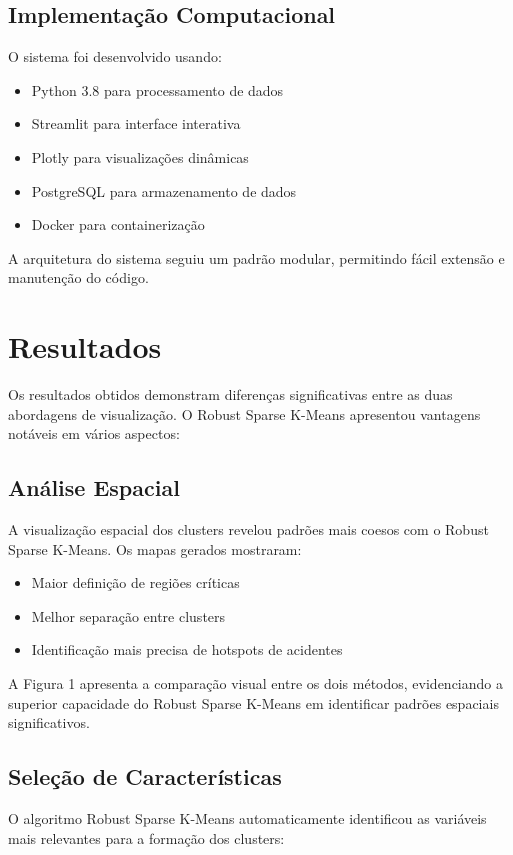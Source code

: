 \documentclass[conference]{IEEEtran}
\begin{document}
\subsection{Implementação Computacional}
O sistema foi desenvolvido usando:
\begin{itemize}
\item Python 3.8 para processamento de dados
\item Streamlit para interface interativa
\item Plotly para visualizações dinâmicas
\item PostgreSQL para armazenamento de dados
\item Docker para containerização
\end{itemize}

A arquitetura do sistema seguiu um padrão modular, permitindo fácil extensão e manutenção do código.

\section{Resultados}
Os resultados obtidos demonstram diferenças significativas entre as duas abordagens de visualização. O Robust Sparse K-Means apresentou vantagens notáveis em vários aspectos:

\subsection{Análise Espacial}
A visualização espacial dos clusters revelou padrões mais coesos com o Robust Sparse K-Means. Os mapas gerados mostraram:

\begin{itemize}
\item Maior definição de regiões críticas
\item Melhor separação entre clusters
\item Identificação mais precisa de hotspots de acidentes
\end{itemize}

A Figura 1 apresenta a comparação visual entre os dois métodos, evidenciando a superior capacidade do Robust Sparse K-Means em identificar padrões espaciais significativos.

\subsection{Seleção de Características}
O algoritmo Robust Sparse K-Means automaticamente identificou as variáveis mais relevantes para a formação dos clusters:
\end{document}
